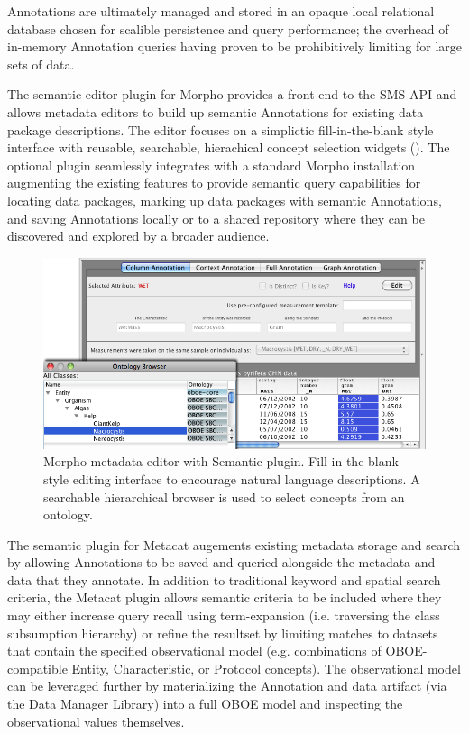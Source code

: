 Annotations are ultimately managed and stored in an opaque local
relational database chosen for scalible persistence and query
performance; the overhead of in-memory Annotation queries having
proven to be prohibitively limiting for large sets of data.

  The semantic editor plugin for
Morpho provides a front-end to the SMS API and allows metadata editors
to build up semantic Annotations for existing data package
descriptions. The editor focuses on a simplictic fill-in-the-blank
style interface with reusable, searchable, hierachical concept
selection widgets (). The optional
plugin seamlessly integrates with a standard Morpho installation
augmenting the existing features to provide semantic query
capabilities for locating data packages, marking up data packages with
semantic Annotations, and saving Annotations locally or to a shared
repository where they can be discovered and explored by a broader
audience.

\begin{figure}
\centering
\includegraphics[width=1.0\textwidth]{images/morpho-annotation-widget.png}
\caption{Morpho metadata editor with Semantic plugin. Fill-in-the-blank style editing interface to encourage natural language descriptions. A searchable hierarchical browser is used to select concepts from an ontology.}
\label{fig:morpho-annotation}
\end{figure}

  The semantic plugin for Metacat
augements existing metadata storage and search by allowing Annotations
to be saved and queried alongside the metadata and data that they
annotate. In addition to traditional keyword and spatial search
criteria, the Metacat plugin allows semantic criteria to be included
where they may either increase query recall using term-expansion
(i.e. traversing the class subsumption hierarchy) or refine the
resultset by limiting matches to datasets that contain the specified
observational model (e.g. combinations of OBOE-compatible Entity,
Characteristic, or Protocol concepts). The observational model can be
leveraged further by materializing the Annotation and data artifact
(via the Data Manager Library) into a full OBOE model and inspecting
the observational values themselves.

